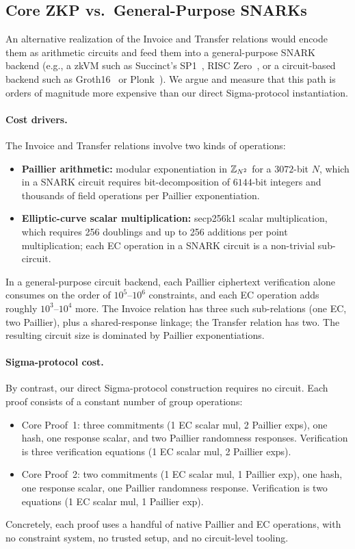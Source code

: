 \subsection{Core ZKP vs.\ General-Purpose SNARKs}\label{sec:eval-snark}

An alternative realization of the Invoice and Transfer relations would encode them as arithmetic circuits and feed them into a general-purpose SNARK backend (e.g., a zkVM such as Succinct's SP1~\cite{sp1}, RISC Zero~\cite{risczero}, or a circuit-based backend such as Groth16~\cite{groth16} or Plonk~\cite{gabizon2019plonk}). We argue and measure that this path is orders of magnitude more expensive than our direct Sigma-protocol instantiation.

\paragraph{Cost drivers.} The Invoice and Transfer relations involve two kinds of operations:
\begin{itemize}
  \item \textbf{Paillier arithmetic:} modular exponentiation in $\mathbb{Z}_{N^2}$ for a $3072$-bit $N$, which in a SNARK circuit requires bit-decomposition of $6144$-bit integers and thousands of field operations per Paillier exponentiation.
  \item \textbf{Elliptic-curve scalar multiplication:} secp256k1 scalar multiplication, which requires 256 doublings and up to 256 additions per point multiplication; each EC operation in a SNARK circuit is a non-trivial sub-circuit.
\end{itemize}
In a general-purpose circuit backend, each Paillier ciphertext verification alone consumes on the order of $10^5$--$10^6$ constraints, and each EC operation adds roughly $10^3$--$10^4$ more. The Invoice relation has three such sub-relations (one EC, two Paillier), plus a shared-response linkage; the Transfer relation has two. The resulting circuit size is dominated by Paillier exponentiations.

\paragraph{Sigma-protocol cost.} By contrast, our direct Sigma-protocol construction requires no circuit. Each proof consists of a constant number of group operations:
\begin{itemize}
  \item Core Proof~1: three commitments (1 EC scalar mul, 2 Paillier exps), one hash, one response scalar, and two Paillier randomness responses. Verification is three verification equations (1 EC scalar mul, 2 Paillier exps).
  \item Core Proof~2: two commitments (1 EC scalar mul, 1 Paillier exp), one hash, one response scalar, one Paillier randomness response. Verification is two equations (1 EC scalar mul, 1 Paillier exp).
\end{itemize}
Concretely, each proof uses a handful of native Paillier and EC operations, with no constraint system, no trusted setup, and no circuit-level tooling.

